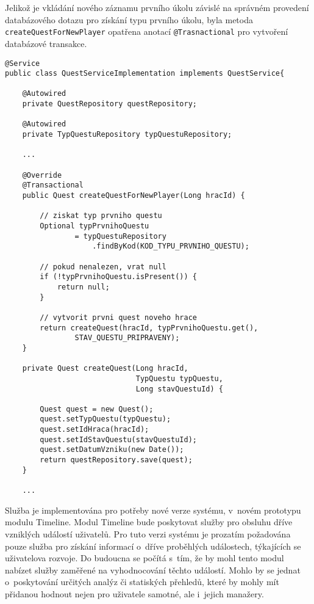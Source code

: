 \documentclass[12pt]{article}
\begin{document}
{Jelikož je vkládání nového záznamu prvního úkolu závislé na správném provedení databázového dotazu pro získání typu prvního úkolu, byla metoda\texttt{ createQuestForNewPlayer} opatřena anotací \texttt{@Trasnactional} pro vytvoření databázové transakce.

\begin{lstlisting}
@Service
public class QuestServiceImplementation implements QuestService{
    
    @Autowired
    private QuestRepository questRepository;
    
    @Autowired
    private TypQuestuRepository typQuestuRepository;
    
    ...
    
    @Override
    @Transactional
    public Quest createQuestForNewPlayer(Long hracId) {

        // ziskat typ prvniho questu
        Optional typPrvnihoQuestu
                = typQuestuRepository
                    .findByKod(KOD_TYPU_PRVNIHO_QUESTU);

        // pokud nenalezen, vrat null
        if (!typPrvnihoQuestu.isPresent()) {
            return null;
        }

        // vytvorit prvni quest noveho hrace
        return createQuest(hracId, typPrvnihoQuestu.get(),
                STAV_QUESTU_PRIPRAVENY);
    }
    
    private Quest createQuest(Long hracId,
                              TypQuestu typQuestu,
                              Long stavQuestuId) {

        Quest quest = new Quest();
        quest.setTypQuestu(typQuestu);
        quest.setIdHraca(hracId);
        quest.setIdStavQuestu(stavQuestuId);
        quest.setDatumVzniku(new Date());
        return questRepository.save(quest);
    }
    
    ...

\end{lstlisting}

\clearpage


Služba je implementována pro potřeby nové verze systému, v~novém prototypu modulu Timeline. 
Modul Timeline bude poskytovat služby pro obsluhu dříve vzniklých událostí uživatelů.
Pro tuto verzi systému je prozatím požadována pouze služba pro získání informací o~dříve
proběhlých událostech, týkajících se uživatelova rozvoje.
Do budoucna se počítá s~tím, že by mohl tento modul nabízet služby zaměřené na vyhodnocování těchto událostí.
Mohlo by se jednat o~poskytování určitých analýz či statiských přehledů,
které by mohly mít přidanou hodnout nejen pro uživatele samotné, ale i~jejich manažery.

}
\end{document}
